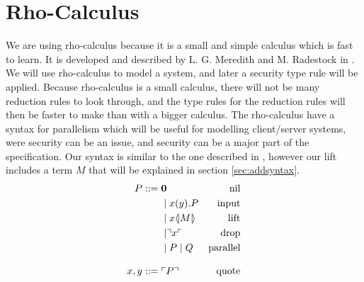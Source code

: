 \section{Rho-Calculus}
We are using rho-calculus because it is a small and simple calculus which is fast to learn.
It is developed and described by L. G. Meredith and M. Radestock in \citep{Meredith2005}.
We will use rho-calculus to model a system, and later a security type rule will be applied.
Because rho-calculus is a small calculus, there will not be many reduction rules to look through, and the type rules for the reduction rules will then be faster to make than with a bigger calculus.
The rho-calculus have a syntax for parallelism which will be useful for modelling client/server systems, were security can be an issue, and security can be a major part of the specification. 
Our syntax is similar to the one described in \citep{Meredith2005}, however our lift includes a term $M$ that will be explained in section \ref{sec:addsyntax}.
\begin{align*}
    P  ::= \; &  \mathbf{0} & \text{nil} \\
      & \mid x(y).P & \text{input} \\
      & \mid x \langle \! | M | \! \rangle & \text{lift} \\
      & \mid \urcorner x \ulcorner & \text{drop} \\
      & \mid P \mid Q & \text{parallel} \\[3mm]
    x,y ::= \; & \ulcorner P \urcorner & \text{quote}\\
\end{align*}



